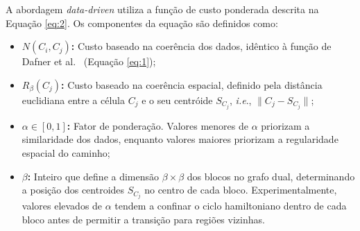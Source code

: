 \documentclass[12pt]{article}
\begin{document}
A abordagem \textit{data-driven} utiliza a função de custo ponderada descrita na Equação \ref{eq:2}.
Os componentes da equação são definidos como:

\begin{itemize} 
    \item \textbf{$N(C_i, C_j)$:} Custo baseado na coerência dos dados, idêntico à função de Dafner et al.~\cite{dafner:00} (Equação \ref{eq:1});
    
    \item \textbf{$R_{\beta}(C_j)$:} Custo baseado na coerência espacial, definido pela distância euclidiana entre a célula $C_j$
    e o seu centróide $S_{C_j}$, \textit{i.e}., $\|C_j - S_{C_j}\|$;
    
    \item \textbf{$\alpha \in [0,1]$:} Fator de ponderação. Valores menores de $\alpha$ priorizam a similaridade dos dados,
    enquanto valores maiores priorizam a regularidade espacial do caminho;
    
    \item \textbf{$\beta$:} Inteiro que define a dimensão $\beta \times \beta$ dos blocos no grafo dual,
    determinando a posição dos centroides $S_{C_j}$ no centro de cada bloco. 
    Experimentalmente, valores elevados de $\alpha$ tendem a confinar o ciclo hamiltoniano dentro de cada bloco
    antes de permitir a transição para regiões vizinhas.
\end{itemize}

\end{document}
